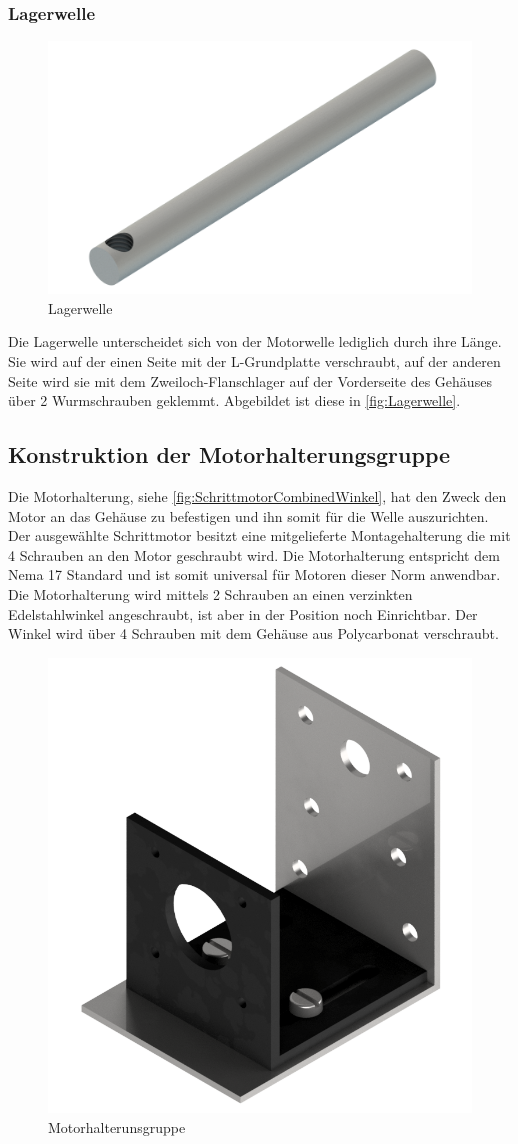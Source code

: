 \pagebreak
\subsubsection{Lagerwelle}
\begin{figure}
    \includegraphics[width=8 cm]{fig/mech/Lagerwelle.png}
    \caption{Lagerwelle}
    \label{fig:Lagerwelle}
\end{figure}

Die Lagerwelle unterscheidet sich von der Motorwelle lediglich durch ihre Länge. Sie wird auf der einen Seite mit der
L-Grundplatte verschraubt, auf der anderen Seite wird sie mit dem Zweiloch-Flanschlager auf der Vorderseite des Gehäuses über
2 Wurmschrauben geklemmt. Abgebildet ist diese in \autoref{fig:Lagerwelle}.\\




\subsection{Konstruktion der Motorhalterungsgruppe}


Die Motorhalterung, siehe \autoref{fig:SchrittmotorCombinedWinkel}, hat den Zweck den Motor an das Gehäuse zu befestigen und ihn somit für die Welle auszurichten. Der ausgewählte Schrittmotor
besitzt eine mitgelieferte Montagehalterung die mit 4 Schrauben an den Motor geschraubt wird. Die Motorhalterung entspricht dem Nema 17
Standard und ist somit universal für Motoren dieser Norm anwendbar. Die Motorhalterung wird mittels 2 Schrauben an einen verzinkten Edelstahlwinkel angeschraubt, ist aber
in der Position noch Einrichtbar. Der Winkel wird über 4 Schrauben mit dem Gehäuse aus Polycarbonat verschraubt. \\

\begin{figure}[H]
    \centering
    \includegraphics[width=6 cm]{fig/mech/SchrittmotorCombinedWinkel}
    \caption{Motorhalterunsgruppe}
    \label{fig:SchrittmotorCombinedWinkel}
\end{figure}

